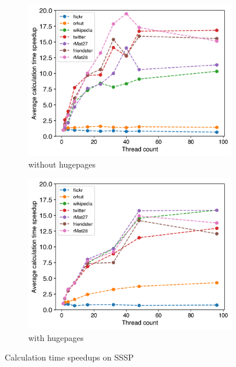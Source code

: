 \begin{figure}
	\hfil
	\begin{subfigure}{0.4\textwidth}
		\includegraphics[width=\linewidth]{../../plots/singleNodeSSSPGaloisThreads.png}
		\caption{without hugepages}
		\label{fig:galoisSpeedupSSSP_noHP}
	\end{subfigure}
	\begin{subfigure}{0.4\textwidth}
		\includegraphics[width=\linewidth]{../../plots/singleNodeSSSPGaloisHPThreads.png}
		\caption{with hugepages}
		\label{fig:galoisSpeedupSSSP_HP}
	\end{subfigure}
	\hfil
	\caption{Calculation time speedups on SSSP}
	\label{fig:galoisSpeedupSSSP}
\end{figure}
